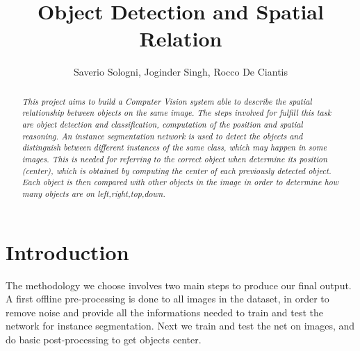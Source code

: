 \documentclass[10pt,twocolumn,letterpaper]{article}
\begin{document}
\title{Object Detection and Spatial Relation}

\author{Saverio Sologni, Joginder Singh, Rocco De Ciantis}
\maketitle


\begin{abstract}
  \textit{This project aims to build a Computer Vision 
  system able to
  describe the spatial relationship between objects on the same image.
  The steps involved for fulfill this task are object detection and classification, 
  computation of the position and spatial reasoning.
  An instance segmentation network is used to detect the objects and distinguish 
  between different instances of the same class, which may happen in some images.
  This is needed for referring to the correct object when determine its position
  (center), which is obtained by computing the center of each previously 
  detected object.
  Each object is then compared with other objects in the image in order to determine
  how many objects are on left,right,top,down.
  }
\end{abstract}

\section{Introduction}
  The methodology we choose involves two main steps to produce our final output.
  A first offline pre-processing is done to all images in the dataset, in order to remove noise
  and provide all the informations needed to train and test the network for instance segmentation.
  Next we train and test the net on images, and do basic post-processing to get objects center.
\end{document}
